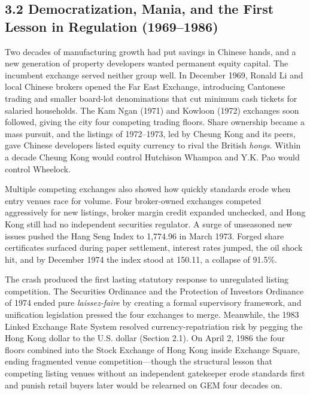 \documentclass[11pt,letterpaper]{article}
\begin{document}
\subsection*{\texorpdfstring{3.2 Democratization, Mania, and the First Lesson in Regulation (1969–1986)}{3.2 Democratization, Mania, and the First Lesson in Regulation (1969–1986)}}
Two decades of manufacturing growth had put savings in Chinese hands, and a new generation of property developers wanted permanent equity capital. The incumbent exchange served neither group well. In December 1969, Ronald Li and local Chinese brokers opened the Far East Exchange, introducing Cantonese trading and smaller board-lot denominations that cut minimum cash tickets for salaried households. The Kam Ngan (1971) and Kowloon (1972) exchanges soon followed, giving the city four competing trading floors. Share ownership became a mass pursuit, and the listings of 1972–1973, led by Cheung Kong and its peers, gave Chinese developers listed equity currency to rival the British \textit{hongs}. Within a decade Cheung Kong would control Hutchison Whampoa and Y.K. Pao would control Wheelock.

Multiple competing exchanges also showed how quickly standards erode when entry venues race for volume. Four broker-owned exchanges competed aggressively for new listings, broker margin credit expanded unchecked, and Hong Kong still had no independent securities regulator. A surge of unseasoned new issues pushed the Hang Seng Index to 1,774.96 in March 1973. Forged share certificates surfaced during paper settlement, interest rates jumped, the oil shock hit, and by December 1974 the index stood at 150.11, a collapse of 91.5\%.

The crash produced the first lasting statutory response to unregulated listing competition. The Securities Ordinance and the Protection of Investors Ordinance of 1974 ended pure \textit{laissez-faire} by creating a formal supervisory framework, and unification legislation pressed the four exchanges to merge. Meanwhile, the 1983 Linked Exchange Rate System resolved currency-repatriation risk by pegging the Hong Kong dollar to the U.S. dollar (Section 2.1). On April 2, 1986 the four floors combined into the Stock Exchange of Hong Kong inside Exchange Square, ending fragmented venue competition—though the structural lesson that competing listing venues without an independent gatekeeper erode standards first and punish retail buyers later would be relearned on GEM four decades on.
\end{document}

